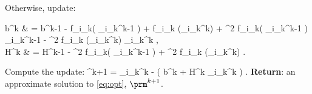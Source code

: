 \documentclass[smallextended]{svjour3}       %
\begin{document}
\begin{algorithm}[t]
\begin{algorithmic}[1]
\begin{split}
   \end{split}
   \eeq
   Otherwise, update:\vspace{-.1cm}
   \beq \label{eq:ciag_n_inc}
   \begin{split}
   {\bm b}^{k} & = {\bm b}^{k-1} - \grd f_{i_k}( \prm_{i_k}^{k-1} ) + \grd f_{i_k} (\prm_{i_k}^k)  + \grd^2 f_{i_k}( \prm_{i_k}^{k-1} ) \prm_{i_k}^{k-1} - \grd^2 f_{i_k} (\prm_{i_k}^k) \prm_{i_k}^k \eqs, \\
   {\bm H}^{k} & = {\bm H}^{k-1} - \grd^2 f_{i_k}( \prm_{i_k}^{k-1} ) + \grd^2 f_{i_k} (\prm_{i_k}^k) \eqs.\\[-.3cm]
   \end{split}
   \eeq
   \STATE \label{ciag_n:upd} Compute the update:\vspace{-.1cm}
   \beq \label{eq:ciag_n_imp} \textstyle
   \prm^{k+1} = \prm_{i_k}^k - \gamma \big( {\bm b}^k + {\bm H}^k \prm_{i_k}^k   \big) \eqs. \vspace{-.1cm}
   \eeq
\ENDFOR
\STATE \textbf{Return}: an approximate solution to \eqref{eq:opt}, $\prm^{k+1}$.
  \end{algorithmic}
\end{algorithm}
\end{document}
